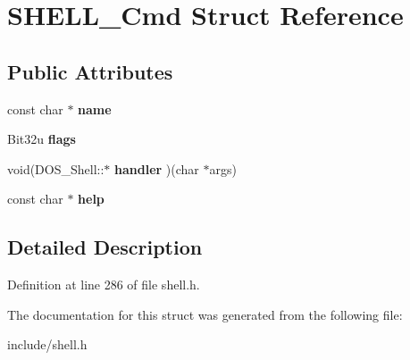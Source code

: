 \hypertarget{structSHELL__Cmd}{\section{S\-H\-E\-L\-L\-\_\-\-Cmd Struct Reference}
\label{structSHELL__Cmd}
}
\subsection*{Public Attributes}
\begin{DoxyCompactItemize}
\item 
\hypertarget{structSHELL__Cmd_a6c2bf878ebb62d9d05eed4e6228ff04b}{const char $\ast$ {\bfseries name}}\label{structSHELL__Cmd_a6c2bf878ebb62d9d05eed4e6228ff04b}

\item 
\hypertarget{structSHELL__Cmd_ae3518365a82721ce9f0b88ba409a36aa}{Bit32u {\bfseries flags}}\label{structSHELL__Cmd_ae3518365a82721ce9f0b88ba409a36aa}

\item 
\hypertarget{structSHELL__Cmd_a8ab69bb42cfd5dd8ca2cf15ce980ebf4}{void(D\-O\-S\-\_\-\-Shell\-::$\ast$ {\bfseries handler} )(char $\ast$args)}\label{structSHELL__Cmd_a8ab69bb42cfd5dd8ca2cf15ce980ebf4}

\item 
\hypertarget{structSHELL__Cmd_a3712fa3ab7cdfbbb384eee27e23b07f2}{const char $\ast$ {\bfseries help}}\label{structSHELL__Cmd_a3712fa3ab7cdfbbb384eee27e23b07f2}

\end{DoxyCompactItemize}


\subsection{Detailed Description}


Definition at line 286 of file shell.\-h.



The documentation for this struct was generated from the following file\-:\begin{DoxyCompactItemize}
\item 
include/shell.\-h\end{DoxyCompactItemize}
